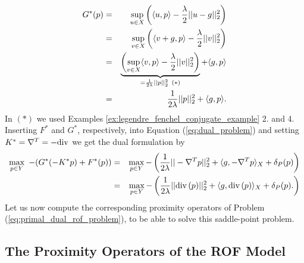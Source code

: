 \documentclass[abstracton]{scrreprt}
\begin{document}
                \begin{eqnarray}
                    G^{\ast}(p) &=& \sup_{u \in X} \left( \langle u, p \rangle - \frac{\lambda}{2} ||u - g||_{2}^{2} \right) \notag \\
                    &=& \sup_{v \in X} \left( \langle v + g, p \rangle - \frac{\lambda}{2} ||v||_{2}^{2} \right) \notag \\
                    &=& \underbrace{\left( \sup_{v \in X} \langle v, p \rangle - \frac{\lambda}{2} ||v||_{2}^{2} \right)}_{= \frac{1}{2\lambda} ||p||_{2}^{2} \,\,\, (\ast)} + \langle g, p \rangle \notag \\
                    &=& \frac{1}{2\lambda} ||p||_{2}^{2} + \langle g, p \rangle. \notag
                \end{eqnarray}
            In $(\ast)$ we used Examples \ref{ex:legendre_fenchel_conjugate_example} 2. and 4. Inserting $F^{\ast}$ and $G^{\ast}$, respectively, into Equation (\ref{eq:dual_problem}) and setting $K^{\ast} = \nabla^{T} = -\textnormal{div}$ we get the dual formulation by
                \begin{eqnarray}
                    \max_{p \in Y}\,\, -(G^{\ast}(-K^{\ast}p) + F^{\ast}(p)) &=& \max_{p \in Y} - \left( \frac{1}{2\lambda} ||-\nabla^{T}p||^{2}_{2} + \langle g, -\nabla^{T}p \rangle_{X} + \delta_{P}(p) \right) \notag \\
                    &=& \max_{p \in Y} - \left( \frac{1}{2\lambda} ||\textnormal{div}\,(p)||^{2}_{2} + \langle g, \textnormal{div}\,(p) \rangle_{X} + \delta_{P}(p). \right) \notag
                \end{eqnarray}
            Let us now compute the corresponding proximity operators of Problem (\ref{eq:primal_dual_rof_problem}), to be able to solve this saddle-point problem.


        \subsection{The Proximity Operators of the ROF Model} %
        \label{sub:the_proximity_operators_for_the_rof_model}
\end{document}
